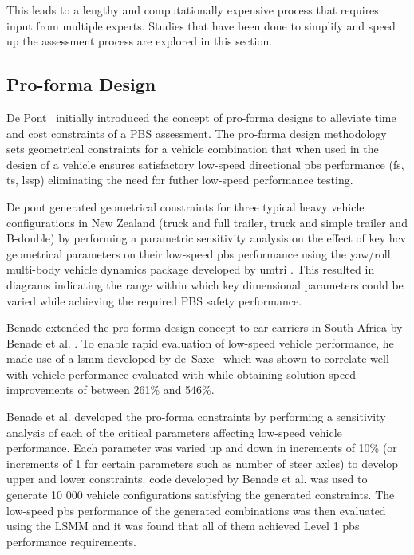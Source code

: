 This leads to a lengthy and computationally expensive process that requires input from multiple experts. Studies that have been done to simplify and speed up the assessment process are explored in this section.

\subsection{Pro-forma Design}\label{section:pro-forma-design}

  De Pont~\cite{Pont2010} initially introduced the concept of pro-forma designs to alleviate time and cost constraints of a PBS assessment. The pro-forma design methodology sets geometrical constraints for a vehicle combination that when used in the design of a vehicle ensures satisfactory low-speed directional \gls{pbs} performance (\gls{fs}, \gls{ts}, \gls{lssp}) eliminating the need for futher low-speed performance testing. 
  
  De pont generated geometrical constraints for three typical heavy vehicle configurations in New Zealand (truck and full trailer, truck and simple trailer and B-double) by performing a parametric sensitivity analysis on the effect of key \gls{hcv} geometrical parameters on their low-speed \gls{pbs} performance using the yaw/roll multi-body vehicle dynamics package developed by \gls{umtri} . This resulted in diagrams indicating the range within which key dimensional parameters could be varied while achieving the required PBS safety performance.
  
  Benade extended the pro-forma design concept to car-carriers in South Africa by Benade et al. \cite{Benade2015}. To enable rapid evaluation of low-speed vehicle performance, he made use of a \gls{lsmm} developed by de~Saxe~\cite{DeSaxe2012}  which was shown to correlate well with vehicle performance evaluated with \trucksim{} while obtaining solution speed improvements of between 261\% and 546\%.
  
  Benade et al. developed the pro-forma constraints by performing a sensitivity analysis of each of the critical parameters affecting low-speed vehicle performance. Each parameter was varied up and down in increments of 10\% (or increments of 1 for certain parameters such as number of steer axles) to develop upper and lower constraints. \matlab{} code developed by Benade et al. was used to generate 10 000 vehicle configurations satisfying the generated constraints. The low-speed \gls{pbs} performance of the generated combinations was then evaluated using the LSMM and it was found that all of them achieved Level 1 \gls{pbs} performance requirements.

